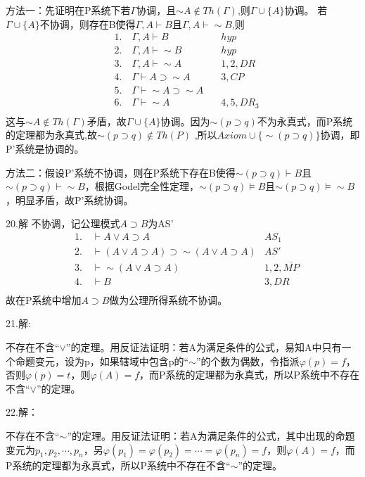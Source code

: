 \documentclass[a4paper]{ctexart}
\begin{document}
方法一：先证明在P系统下若$\Gamma$协调，且$\sim A\not\in Th(\Gamma)$,则$\Gamma\cup \{A\}$协调。
若$\Gamma\cup \{A\}$不协调，则存在B使得$\Gamma,A\vdash B$且$\Gamma,A\vdash \sim B$,则
\begin{align*}
  &1.\quad \Gamma,A\vdash B \quad & hyp \\
  &2.\quad \Gamma,A\vdash \sim B \quad & hyp \\
  &3.\quad \Gamma,A\vdash \sim A \quad & 1,2,DR\\
  &4.\quad \Gamma\vdash A\supset \sim A \quad&  3,CP\\
  &5.\quad \Gamma\vdash \sim A\supset \sim A  \quad & \\
  &6.\quad \Gamma\vdash \sim A \quad & 4,5,DR_3\\
\end{align*}这与$\sim A\not\in Th(\Gamma)$矛盾，故$\Gamma\cup \{A\}$协调。因为$\sim(p\supset q)$不为永真式，而P系统的定理都为永真式,故$\sim(p\supset q)\not\in Th(P)$ ,所以$Axiom\cup\{\sim(p\supset q)\}$协调，即P'系统是协调的。

方法二：假设P'系统不协调，则在P系统下存在B使得$\sim(p\supset q)\vdash B$且$\sim(p\supset q)\vdash \sim B$，根据Godel完全性定理，$\sim(p\supset q)\models B$且$\sim(p\supset q)\models \sim B$，明显矛盾，故P'系统协调。\newline

\noindent 20.解
不协调，记公理模式$A\supset B$为AS'
\begin{align*}
  &1.\quad \vdash A\vee A\supset A &AS_{1} \\
  &2.\quad \vdash (A\vee A\supset A)\supset \sim(A\vee A\supset A)&AS' \\
  &3.\quad \vdash \sim(A\vee A\supset A) &1,2,\overline{MP} \\
  &4.\quad \vdash B &3,DR \\
\end{align*}
故在P系统中增加$A\supset B$做为公理所得系统不协调。\newline

\noindent 21.解:

不存在不含“$\vee$”的定理。用反证法证明：若A为满足条件的公式，易知A中只有一个命题变元，设为p，如果辖域中包含p的“$\sim$”的个数为偶数，令指派$\varphi(p)=f$，否则$\varphi(p)=t$，则$\varphi(A)=f$，而P系统的定理都为永真式，所以P系统中不存在不含“$\vee$”的定理。\newline

\noindent 22.解：

不存在不含“$\sim$”的定理。用反证法证明：若A为满足条件的公式，其中出现的命题变元为$p_1,p_2,\cdots,p_n$，另$\varphi(p_1)=\varphi(p_2)=\cdots=\varphi(p_n)=f$，则$\varphi(A)=f$，而P系统的定理都为永真式，所以P系统中不存在不含“$\sim$”的定理。\newline
\end{document}
